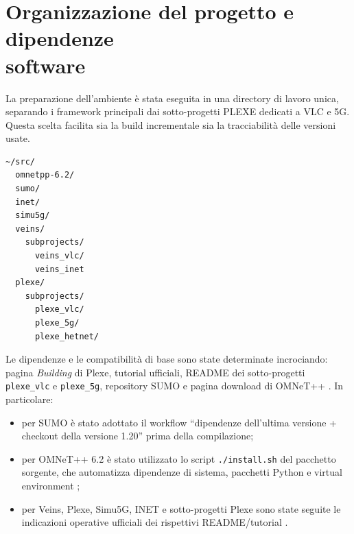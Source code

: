 \section[Organizzazione del progetto e dipendenze software]{Organizzazione del progetto e dipendenze\\ software}

La preparazione dell’ambiente è stata eseguita in una directory di lavoro unica, separando i framework principali dai sotto-progetti PLEXE dedicati a VLC e 5G. Questa scelta facilita sia la build incrementale sia la tracciabilità delle versioni usate.

\begin{lstlisting}[caption={Layout di riferimento del workspace locale},label={lst:workspace_layout}]
~/src/
  omnetpp-6.2/
  sumo/
  inet/
  simu5g/
  veins/
    subprojects/
      veins_vlc/
      veins_inet
  plexe/
    subprojects/
      plexe_vlc/
      plexe_5g/
      plexe_hetnet/
\end{lstlisting}

Le dipendenze e le compatibilità di base sono state determinate incrociando: pagina \emph{Building} di Plexe, tutorial ufficiali, README dei sotto-progetti \texttt{plexe\_vlc} e \texttt{plexe\_5g}, repository SUMO e pagina download di OMNeT++ \cite{plexe_building,plexe_tutorial,plexe_vlc_readme,plexe_5g_readme,sumo_repo,omnet_download}. In particolare:
\begin{itemize}
\item per SUMO è stato adottato il workflow ``dipendenze dell’ultima versione + checkout della versione 1.20'' prima della compilazione;
\item per OMNeT++ 6.2 è stato utilizzato lo script \texttt{./install.sh} del pacchetto sorgente, che automatizza dipendenze di sistema, pacchetti Python e virtual environment \cite{omnet_download};
\item per Veins, Plexe, Simu5G, INET e sotto-progetti Plexe sono state seguite le indicazioni operative ufficiali dei rispettivi README/tutorial \cite{plexe_building,plexe_vlc_readme,plexe_5g_readme}.
\end{itemize}
